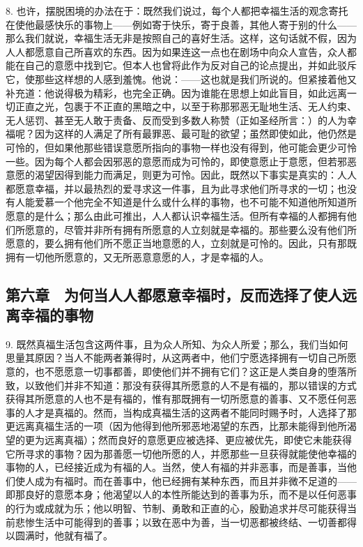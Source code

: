 8. 也许，摆脱困境的办法在于：既然我们说过，每个人都把幸福生活的观念寄托在使他最感快乐的事物上——例如寄于快乐，寄于良善，其他人寄于别的什么——那么我们就说，幸福生活无非是按照自己的喜好生活。这样，这句话就不假，因为人人都愿意自己所喜欢的东西。因为如果连这一点也在剧场中向众人宣告，众人都能在自己的意愿中找到它。但本人也曾将此作为反对自己的论点提出，并如此驳斥它，使那些这样想的人感到羞愧。他说：——这也就是我们所说的。但紧接着他又补充道：他说得极为精彩，也完全正确。因为谁能在思想上如此盲目，如此远离一切正直之光，包裹于不正直的黑暗之中，以至于称那邪恶无耻地生活、无人约束、无人惩罚、甚至无人敢于责备、反而受到多数人称赞（正如圣经所言：）的人为幸福呢？因为这样的人满足了所有最罪恶、最可耻的欲望；虽然即使如此，他仍然是可怜的，但如果他那些错误意愿所指向的事物一样也没有得到，他可能会更少可怜一些。因为每个人都会因邪恶的意愿而成为可怜的，即使意愿止于意愿，但若邪恶意愿的渴望因得到能力而满足，则更为可怜。因此，既然以下事实是真实的：人人都愿意幸福，并以最热烈的爱寻求这一件事，且为此寻求他们所寻求的一切；也没有人能爱慕一个他完全不知道是什么或什么样的事物，也不可能不知道他所知道所愿意的是什么；那么由此可推出，人人都认识幸福生活。但所有幸福的人都拥有他们所愿意的，尽管并非所有拥有所愿意的人立刻就是幸福的。那些要么没有他们所愿意的，要么拥有他们所不愿正当地意愿的人，立刻就是可怜的。因此，只有那既拥有一切他所愿意的，又无所恶意意愿的人，才是幸福的人。\par


\subsection{第六章　为何当人人都愿意幸福时，反而选择了使人远离幸福的事物}

9. 既然真福生活包含这两件事，且为众人所知、为众人所爱；那么，我们当如何思量其原因？当人不能两者兼得时，从这两者中，他们宁愿选择拥有一切自己所愿意的，也不愿愿意一切事都善，即使他们并不拥有它们？这正是人类自身的堕落所致，以致他们并非不知道：那没有获得其所愿意的人不是有福的，那以错误的方式获得其所愿意的人也不是有福的，惟有那既拥有一切所愿意的善事、又不愿任何恶事的人才是真福的。然而，当构成真福生活的这两者不能同时赐予时，人选择了那更远离真福生活的一项（因为他得到他所邪恶地渴望的东西，比那未能得到他所渴望的更为远离真福）；然而良好的意愿更应被选择、更应被优先，即使它未能获得它所寻求的事物？因为那善愿一切他所愿的人，并愿那些一旦获得就能使他幸福的事物的人，已经接近成为有福的人。当然，使人有福的并非恶事，而是善事，当他们使人成为有福时。而在善事中，他已经拥有某种东西，而且并非微不足道的——即那良好的意愿本身；他渴望以人的本性所能达到的善事为乐，而不是以任何恶事的行为或成就为乐；他以明智、节制、勇敢和正直的心，殷勤追求并尽可能获得当前悲惨生活中可能得到的善事；以致在恶中为善，当一切恶都被终结、一切善都得以圆满时，他就有福了。\par

